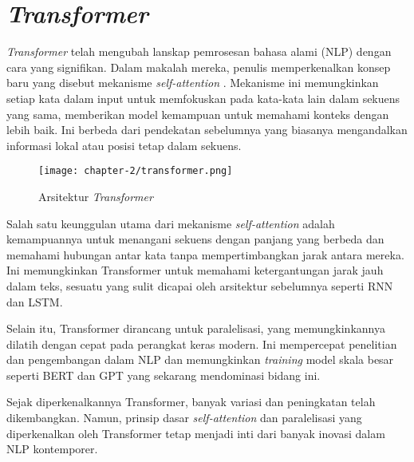 \section{\textit{Transformer}}

\textit{Transformer} telah mengubah lanskap pemrosesan bahasa alami (NLP) dengan cara yang signifikan. Dalam makalah mereka, penulis memperkenalkan konsep baru yang disebut mekanisme \textit{self-attention} \parencite{transformers}. Mekanisme ini memungkinkan setiap kata dalam input untuk memfokuskan pada kata-kata lain dalam sekuens yang sama, memberikan model kemampuan untuk memahami konteks dengan lebih baik. Ini berbeda dari pendekatan sebelumnya yang biasanya mengandalkan informasi lokal atau posisi tetap dalam sekuens.

\begin{figure}[ht]
    \centering
    \texttt{[image: chapter-2/transformer.png]}
    \caption{Arsitektur \textit{Transformer} \parencite{transformers}}
    \label{fig:transformer}
\end{figure}

Salah satu keunggulan utama dari mekanisme \textit{self-attention} adalah kemampuannya untuk menangani sekuens dengan panjang yang berbeda dan memahami hubungan antar kata tanpa mempertimbangkan jarak antara mereka. Ini memungkinkan Transformer untuk memahami ketergantungan jarak jauh dalam teks, sesuatu yang sulit dicapai oleh arsitektur sebelumnya seperti RNN dan LSTM.

Selain itu, Transformer dirancang untuk paralelisasi, yang memungkinkannya dilatih dengan cepat pada perangkat keras modern. Ini mempercepat penelitian dan pengembangan dalam NLP dan memungkinkan \textit{training} model skala besar seperti BERT dan GPT yang sekarang mendominasi bidang ini.

Sejak diperkenalkannya Transformer, banyak variasi dan peningkatan telah dikembangkan. Namun, prinsip dasar \textit{self-attention} dan paralelisasi yang diperkenalkan oleh Transformer tetap menjadi inti dari banyak inovasi dalam NLP kontemporer.